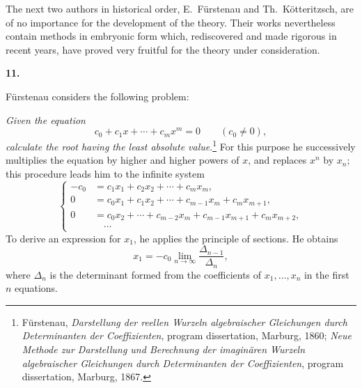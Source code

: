 \documentclass[
  paper=b5,
  fontsize=13pt,
  twoside=true,
  open=any,
  bookmarkpackage=false,
  chapterprefix=true,
  headings=normal
]{scrbook}
\theoremstyle{definition}
\newcommand{\numberedparagraph}[1]{%
  \par\medskip\phantomsection\label{sec:#1}%
  \noindent\textbf{#1.}\enspace
}
\begin{document}
The next two authors in historical order, E.~F\"urstenau and Th.~K\"otteritzsch, are of no importance for the development of the theory. Their works nevertheless contain methods in embryonic form which, rediscovered and made rigorous in recent years, have proved very fruitful for the theory under consideration.

\numberedparagraph{11}
F\"urstenau considers the following problem:

\emph{Given the equation}
\begin{equation}
  c_0+c_1x+\cdots+c_mx^m=0\qquad(c_0\ne0),
  \tag{9}\label{eq:11:9}
\end{equation}
\emph{calculate the root having the least absolute value}.\footnote{F\"urstenau, \emph{Darstellung der reellen Wurzeln algebraischer Gleichungen durch Determinanten der Coeffizienten}, program dissertation, Marburg, 1860; \emph{Neue Methode zur Darstellung und Berechnung der imagin\"aren Wurzeln algebraischer Gleichungen durch Determinanten der Coeffizienten}, program dissertation, Marburg, 1867.} For this purpose he successively multiplies the equation by higher and higher powers of $x$, and replaces $x^n$ by $x_n$; this procedure leads him to the infinite system
\[
\left\{
\begin{aligned}
  -c_0&=c_1x_1+c_2x_2+\cdots+c_mx_m,\\
  0&=c_0x_1+c_1x_2+\cdots+c_{m-1}x_m+c_mx_{m+1},\\
  0&=c_0x_2+\cdots+c_{m-2}x_m+c_{m-1}x_{m+1}+c_mx_{m+2},\\
  &\hspace{1em}\cdots
\end{aligned}
\right.
\]
To derive an expression for $x_1$, he applies the principle of sections. He obtains
\begin{equation}
  x_1=-c_0\lim_{n\to\infty}\frac{\Delta_{n-1}}{\Delta_n},
  \tag{10}\label{eq:11:10}
\end{equation}
where $\Delta_n$ is the determinant formed from the coefficients of $x_1,\ldots,x_n$ in the first $n$ equations.
\end{document}

